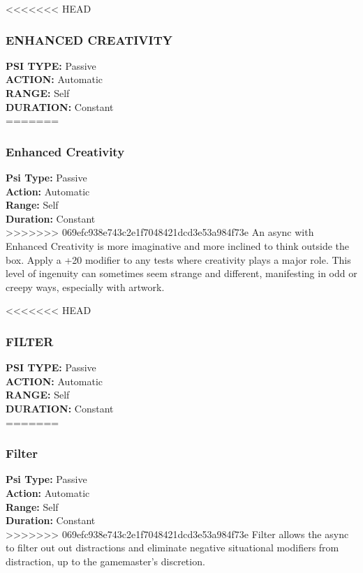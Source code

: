 <<<<<<< HEAD \subsubsection{ENHANCED CREATIVITY} \textbf{PSI TYPE:} Passive \\ \textbf{ACTION:} Automatic \\ \textbf{RANGE:} Self \\ \textbf{DURATION:} Constant \\ ======= \subsubsection{Enhanced Creativity} \textbf{Psi Type:} Passive \\ \textbf{Action:} Automatic \\ \textbf{Range:} Self \\ \textbf{Duration:} Constant \\ >>>>>>> 069efc938e743c2e1f7048421dcd3e53a984f73e An async with Enhanced Creativity is more imaginative and more inclined to think outside the box. Apply a +20 modifier to any tests where creativity plays a major role. This level of ingenuity can sometimes seem strange and different, manifesting in odd or creepy ways, especially with artwork. 

<<<<<<< HEAD \subsubsection{FILTER} \textbf{PSI TYPE:} Passive \\ \textbf{ACTION:} Automatic \\ \textbf{RANGE:} Self \\ \textbf{DURATION:} Constant \\ ======= \subsubsection{Filter} \textbf{Psi Type:} Passive \\ \textbf{Action:} Automatic \\ \textbf{Range:} Self \\ \textbf{Duration:} Constant \\ >>>>>>> 069efc938e743c2e1f7048421dcd3e53a984f73e Filter allows the async to filter out out distractions and eliminate negative situational modifiers from distraction, up to the gamemaster’s discretion. 

